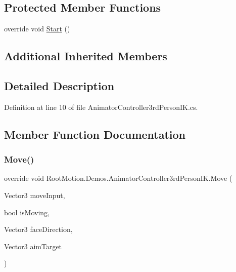 \subsection*{Protected Member Functions}
\begin{DoxyCompactItemize}
\item 
override void \mbox{\hyperlink{class_root_motion_1_1_demos_1_1_animator_controller3rd_person_i_k_a2da8e38a44df44d929d59242cf3fb44a}{Start}} ()
\end{DoxyCompactItemize}
\subsection*{Additional Inherited Members}


\subsection{Detailed Description}


Definition at line 10 of file Animator\+Controller3rd\+Person\+I\+K.\+cs.



\subsection{Member Function Documentation}
\mbox{\label{class_root_motion_1_1_demos_1_1_animator_controller3rd_person_i_k_a0aad38e138a483b9dc302735016d6138}} 
\subsubsection{\texorpdfstring{Move()}{Move()}}
{\footnotesize\ttfamily override void Root\+Motion.\+Demos.\+Animator\+Controller3rd\+Person\+I\+K.\+Move (\begin{DoxyParamCaption}\item[{Vector3}]{move\+Input,  }\item[{bool}]{is\+Moving,  }\item[{Vector3}]{face\+Direction,  }\item[{Vector3}]{aim\+Target }\end{DoxyParamCaption})\hspace{0.3cm}{\ttfamily [virtual]}}



